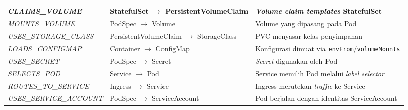 \begin{footnotesize}
\begin{longtable}{|p{3.4cm}|p{4.4cm}|p{4.5cm}|}
\hline
\textit{CLAIMS\_VOLUME} & StatefulSet $\rightarrow$ PersistentVolumeClaim & \textit{Volume claim templates} StatefulSet \\
\hline
\textit{MOUNTS\_VOLUME} & PodSpec $\rightarrow$ Volume & Volume yang dipasang pada Pod \\
\hline
\textit{USES\_STORAGE\_CLASS} & PersistentVolumeClaim $\rightarrow$ StorageClass & PVC menyasar kelas penyimpanan \\
\hline
\textit{LOADS\_CONFIGMAP} & Container $\rightarrow$ ConfigMap & Konfigurasi dimuat via \texttt{envFrom}/\texttt{volumeMounts} \\
\hline
\textit{USES\_SECRET} & PodSpec $\rightarrow$ Secret & \textit{Secret} digunakan oleh Pod \\
\hline
\textit{SELECTS\_POD} & Service $\rightarrow$ Pod & Service memilih Pod melalui \textit{label selector} \\
\hline
\textit{ROUTES\_TO\_SERVICE} & Ingress $\rightarrow$ Service & Ingress merutekan \textit{traffic} ke Service \\
\hline
\textit{USES\_\allowbreak SERVICE\_ACCOUNT} & PodSpec $\rightarrow$ ServiceAccount & Pod berjalan dengan identitas ServiceAccount \\
\hline
\end{longtable}
\end{footnotesize}
